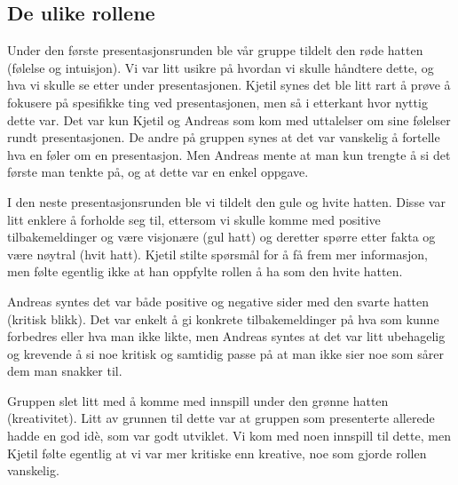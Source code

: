\subsection{De ulike rollene}
Under den første presentasjonsrunden ble vår gruppe tildelt den røde hatten (følelse og intuisjon). Vi var litt usikre på hvordan vi skulle håndtere dette, og hva vi skulle se etter under presentasjonen. Kjetil synes det ble litt rart å prøve å fokusere på spesifikke ting ved presentasjonen, men så i etterkant hvor nyttig dette var. Det var  kun Kjetil og Andreas som kom med uttalelser om sine følelser rundt presentasjonen. De andre på gruppen synes at det var vanskelig å fortelle hva en føler om en presentasjon. Men Andreas mente at man kun trengte å si det første man tenkte på, og at dette var en enkel oppgave. 

I den neste presentasjonsrunden ble vi tildelt den gule og hvite hatten. Disse var litt enklere å forholde seg til, ettersom vi skulle komme med positive tilbakemeldinger og være visjonære (gul hatt) og deretter spørre etter fakta og være nøytral (hvit hatt). Kjetil stilte spørsmål for å få frem mer informasjon, men følte egentlig ikke at han oppfylte rollen å ha som den hvite hatten.

Andreas syntes det var både positive og negative sider med den svarte hatten (kritisk blikk). Det var enkelt å gi konkrete tilbakemeldinger på hva som kunne forbedres eller hva man ikke likte, men Andreas syntes at det var litt ubehagelig og krevende å si noe kritisk og samtidig passe på at man ikke sier noe som sårer dem man snakker til.

Gruppen slet litt med å komme med innspill under den grønne hatten (kreativitet). Litt av grunnen til dette var at gruppen som presenterte allerede hadde en god idè, som var godt utviklet. Vi kom med noen innspill til dette, men Kjetil følte egentlig at vi var mer kritiske enn kreative, noe som gjorde rollen vanskelig.


